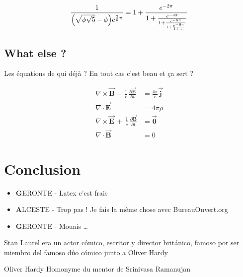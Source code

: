 \documentclass[twocolumn,a4paper]{IEEEtranfr}
\begin{document}
\begin{equation}
  \frac{1}{\Bigl(\sqrt{\phi \sqrt{5}}-\phi\Bigr) e^{\frac25 \pi}} =
    1 + \frac{e^{-2\pi}} 
             {1+\frac{e^{-4\pi}} 
             {1+\frac{e^{-6\pi}}
             {1+\frac{e^{-8\pi}} 
             {1+\ldots} } } }
\end{equation}

\subsection{What else ? }

Les équations de qui déjà ? En tout cas c'est beau et ça sert ?

\begin{equation}
\begin{aligned}
    \nabla \times \vec{\mathbf{B}} -\, \frac1c\,
    \frac{\partial\vec{\mathbf{E}}}{\partial t} & = \frac{4\pi}{c}\vec{\mathbf{j}} \\  
    \nabla \cdot \vec{\mathbf{E}} & = 4 \pi \rho \\
    \nabla \times \vec{\mathbf{E}}\, +\, \frac1c\,
    \frac{\partial\vec{\mathbf{B}}}{\partial t} & = \vec{\mathbf{0}} \\
    \nabla \cdot \vec{\mathbf{B}} & = 0
\end{aligned}
\end{equation}

\section{Conclusion}
\begin{itemize}
  \item {\textbf GERONTE} - Latex c'est frais
  \item {\textbf ALCESTE} - Trop pas  ! Je fais la même chose avec BureauOuvert.org
  \item {\textbf GERONTE} - Mouais \dots
\end{itemize}
%
%

%


{}
\begin{IEEEbiography}
{Stan Laurel } era un actor cómico, escritor y director británico,
famoso por ser miembro del famoso dúo cómico junto a Oliver Hardy 

\end{IEEEbiography}

\begin{IEEEbiography}
{Oliver Hardy} Homonyme du mentor de Srinivasa Ramanujan
\end{IEEEbiography}
\end{document}
